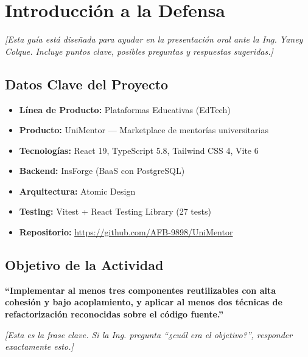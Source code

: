 \documentclass[12pt, a4paper]{article}
\newcommand{\nota}[1]{%
  \textcolor{upds-gold}{\small\textit{[#1]}}%
}
\begin{document}
\pagestyle{fancy}
\fancyhf{}
\fancyhead[L]{\small \textcolor{upds-blue}{UPDS — Ingeniería de Sistemas}}
\fancyhead[R]{\small \textcolor{upds-blue}{Defensa Actividad 1}}
\fancyfoot[R]{\small \thepage}
\renewcommand{\headrulewidth}{0.4pt}
\renewcommand{\footrulewidth}{0.4pt}

\tableofcontents
\newpage

\section{Introducción a la Defensa}
\nota{Esta guía está diseñada para ayudar en la presentación oral ante la Ing. Yaney Colque. Incluye puntos clave, posibles preguntas y respuestas sugeridas.}

\subsection{Datos Clave del Proyecto}

\begin{itemize}
  \item \textbf{Línea de Producto:} Plataformas Educativas (EdTech)
  \item \textbf{Producto:} UniMentor — Marketplace de mentorías universitarias
  \item \textbf{Tecnologías:} React 19, TypeScript 5.8, Tailwind CSS 4, Vite 6
  \item \textbf{Backend:} InsForge (BaaS con PostgreSQL)
  \item \textbf{Arquitectura:} Atomic Design
  \item \textbf{Testing:} Vitest + React Testing Library (27 tests)
  \item \textbf{Repositorio:} \url{https://github.com/AFB-9898/UniMentor}
\end{itemize}

\subsection{Objetivo de la Actividad}

\textbf{``Implementar al menos tres componentes reutilizables con alta cohesión y bajo acoplamiento, y aplicar al menos dos técnicas de refactorización reconocidas sobre el código fuente.''}

\nota{Esta es la frase clave. Si la Ing. pregunta ``¿cuál era el objetivo?'', responder exactamente esto.}
\end{document}
